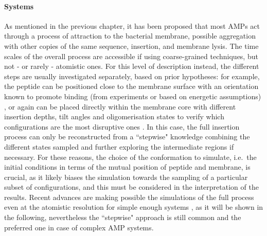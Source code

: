 \paragraph{Systems} As mentioned in the previous chapter, it has been proposed that most AMPs act through a process of attraction to the bacterial membrane, possible aggregation with other copies of the same sequence, insertion, and membrane lysis. The time scales of the overall process are accessible if using coarse-grained techniques, but not - or rarely - atomistic ones.
%
For this level of description instead, the different steps are usually investigated separately, based on prior hypotheses: for example, the peptide can be positioned close to the membrane surface with an orientation known to promote binding (from experiments or based on energetic assumptions) \citep{Wang2012}, or again can be placed directly within the membrane core with different insertion depths, tilt angles and oligomerisation states to verify which configurations are the most disruptive ones \citep{Lipkin2017}. In this case, the full insertion process can only be reconstructed from a ``stepwise" knowledge combining the different states sampled and further exploring the intermediate regions if necessary.
%
For these reasons, the choice of the conformation to simulate, i.e.\ the initial conditions in terms of the mutual position of peptide and membrane, is crucial, as it likely biases the simulation towards the sampling of a particular subset of configurations, and this must be considered in the interpretation of the results. Recent advances are making possible the simulations of the full process even at the atomistic resolution for simple enough systems \citep{Ulmschneider2017,Sun2015}, as it will be shown in the following, nevertheless the ``stepwise" approach is still common and the preferred one in case of complex AMP systems.

